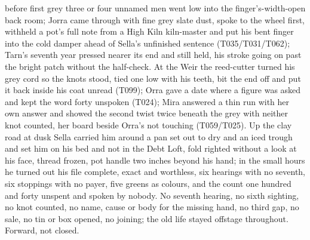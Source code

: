 \documentclass{design/chronicle}
\begin{document}
{\begin{itemize}[leftmargin=1.4em,itemsep=1pt,topsep=3pt,parsep=0pt]
before first grey three or four unnamed men went low into the finger’s-width-open back room; Jorra came through with fine grey slate dust, spoke to the wheel first, withheld a pot’s full note from a High Kiln kiln-master and put his bent finger into the cold damper ahead of Sella’s unfinished sentence (T035/T031/T062); Tarn’s seventh year pressed nearer its end and still held, his stroke going on past the bright patch without the half-check. At the Weir the reed-cutter turned his grey cord so the knots stood, tied one low with his teeth, bit the end off and put it back inside his coat unread (T099); Orra gave a date where a figure was asked and kept the word forty unspoken (T024); Mira answered a thin run with her own answer and showed the second twist twice beneath the grey with neither knot counted, her board beside Orra’s not touching (T059/T025). Up the clay road at dusk Sella carried him around a pan set out to dry and an iced trough and set him on his bed and not in the Debt Loft, fold righted without a look at his face, thread frozen, pot handle two inches beyond his hand; in the small hours he turned out his file complete, exact and worthless, six hearings with no seventh, six stoppings with no payer, five greens as colours, and the count one hundred and forty unspent and spoken by nobody. No seventh hearing, no sixth sighting, no knot counted, no name, cause or body for the missing hand, no third gap, no sale, no tin or box opened, no joining; the old life stayed offstage throughout. Forward, not closed.

\end{itemize}

\begin{itemize}[leftmargin=1.4em,itemsep=1pt,topsep=3pt,parsep=0pt]


\end{itemize}}
\end{document}

